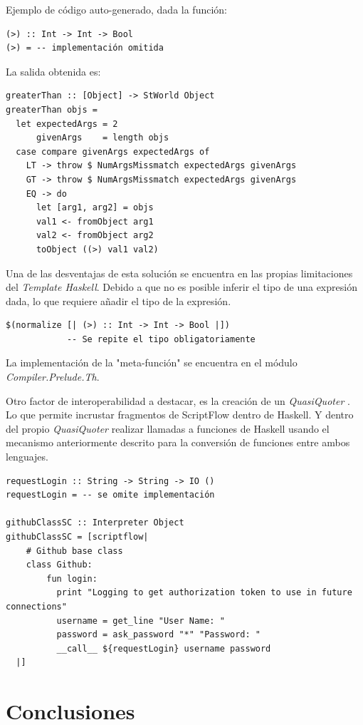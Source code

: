 \documentclass[11pt]{article}
\begin{document}
Ejemplo de código auto-generado, dada la función:
\begin{verbatim}
(>) :: Int -> Int -> Bool
(>) = -- implementación omitida
\end{verbatim}

La salida obtenida es:
\begin{verbatim}
greaterThan :: [Object] -> StWorld Object
greaterThan objs =
  let expectedArgs = 2
      givenArgs    = length objs
  case compare givenArgs expectedArgs of
    LT -> throw $ NumArgsMissmatch expectedArgs givenArgs
    GT -> throw $ NumArgsMissmatch expectedArgs givenArgs
    EQ -> do
      let [arg1, arg2] = objs
      val1 <- fromObject arg1
      val2 <- fromObject arg2
      toObject ((>) val1 val2)
\end{verbatim}

Una de las desventajas de esta solución se encuentra en las propias limitaciones del \emph{Template Haskell}. Debido a que no es posible
inferir el tipo de una expresión dada, lo que requiere añadir el tipo de la expresión.
\begin{verbatim}
$(normalize [| (>) :: Int -> Int -> Bool |])
            -- Se repite el tipo obligatoriamente
\end{verbatim}

La implementación de la "meta-función" se encuentra en el módulo \emph{Compiler.Prelude.Th}.

Otro factor de interoperabilidad a destacar, es la creación de un \emph{QuasiQuoter} \cite{quasi-quoter}. Lo que permite incrustar fragmentos de ScriptFlow
dentro de Haskell. Y dentro del propio \emph{QuasiQuoter} realizar llamadas a funciones de Haskell usando el mecanismo anteriormente descrito
para la conversión de funciones entre ambos lenguajes.

\begin{verbatim}
requestLogin :: String -> String -> IO ()
requestLogin = -- se omite implementación

githubClassSC :: Interpreter Object
githubClassSC = [scriptflow|
    # Github base class
    class Github:
        fun login:
          print "Logging to get authorization token to use in future connections"
          username = get_line "User Name: "
          password = ask_password "*" "Password: "
          __call__ ${requestLogin} username password
  |]
\end{verbatim}

\section{Conclusiones}
\label{sec:org0a79fa3}
\end{document}
